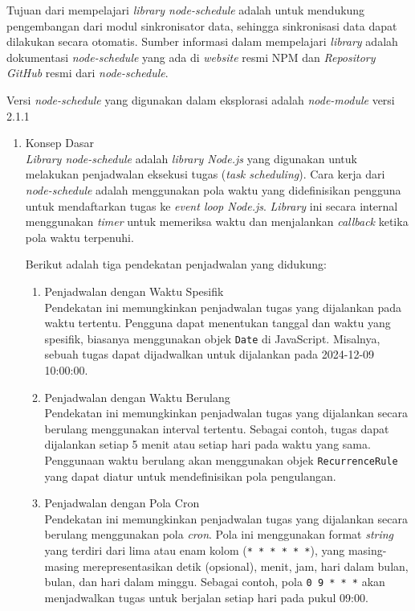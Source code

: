 Tujuan dari mempelajari \textit{library node-schedule} adalah untuk mendukung pengembangan dari modul sinkronisator data, sehingga sinkronisasi data dapat dilakukan secara otomatis. Sumber informasi dalam mempelajari \textit{library} adalah dokumentasi \textit{node-schedule} yang ada di \textit{website} resmi NPM dan \textit{Repository GitHub} resmi dari \textit{node-schedule}.

Versi \textit{node-schedule} yang digunakan dalam eksplorasi adalah \textit{node-module} versi 2.1.1
    
\begin{enumerate}[label*=\arabic*.,ref=\arabic*]
    \item Konsep Dasar\\
    \textit{Library node-schedule} adalah \textit{library Node.js} yang digunakan untuk melakukan penjadwalan eksekusi tugas (\textit{task scheduling}). Cara kerja dari \textit{node-schedule} adalah menggunakan pola waktu yang didefinisikan pengguna untuk mendaftarkan tugas ke\textit{ event loop Node.js}. \textit{Library} ini secara internal menggunakan \textit{timer} untuk memeriksa waktu dan menjalankan \textit{callback} ketika pola waktu terpenuhi.

    Berikut adalah tiga pendekatan penjadwalan yang didukung:
    \begin{enumerate}[label*=\arabic*.,ref=\arabic*]
        \item Penjadwalan dengan Waktu Spesifik\\
        Pendekatan ini memungkinkan penjadwalan tugas yang dijalankan pada waktu tertentu. Pengguna dapat menentukan tanggal dan waktu yang spesifik, biasanya menggunakan objek \texttt{Date} di JavaScript. Misalnya, sebuah tugas dapat dijadwalkan untuk dijalankan pada 2024-12-09 10:00:00.

        \item Penjadwalan dengan Waktu Berulang\\
        Pendekatan ini memungkinkan penjadwalan tugas yang dijalankan secara berulang menggunakan interval tertentu. Sebagai contoh, tugas dapat dijalankan setiap 5 menit atau setiap hari pada waktu yang sama. Penggunaan waktu berulang akan menggunakan objek \texttt{RecurrenceRule} yang dapat diatur untuk mendefinisikan pola pengulangan.
             
        \item Penjadwalan dengan Pola Cron\\
        Pendekatan ini memungkinkan penjadwalan tugas yang dijalankan secara berulang menggunakan pola \textit{cron}. Pola ini menggunakan format \textit{string} yang terdiri dari lima atau enam kolom (\texttt{* * * * * *}), yang masing-masing merepresentasikan detik (opsional), menit, jam, hari dalam bulan, bulan, dan hari dalam minggu. Sebagai contoh, pola \texttt{0 9 * * *} akan menjadwalkan tugas untuk berjalan setiap hari pada pukul 09:00.


\end{enumerate}
\end{enumerate}
